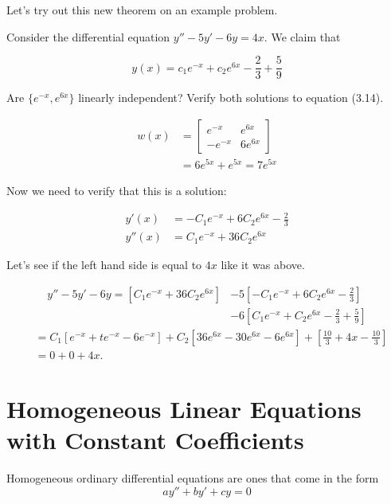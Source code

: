   Let's try out this new theorem on an example problem.

  \begin{problem}
    Consider the differential equation $y''-5y'-6y=4x$. We claim that 

    \begin{equation}
      y(x)=c_1e^{-x}+c_2e^{6x}-\frac{2}{3}+\frac{5}{9}
    \end{equation}

    Are $\{e^{-x},e^{6x}\}$ linearly independent? Verify both solutions to equation (3.14).

    \begin{align}
      w(x)&=\begin{bmatrix} e^{-x}&e^{6x}\\-e^{-x}&6e^{6x} \end{bmatrix} \\
          &=6e^{5x}+e^{5x}=7e^{5x}
    \end{align}

    Now we need to verify that this is a solution:

    \begin{align}
      y'(x)&=-C_1e^{-x}+6C_2e^{6x}-\frac{2}{3}\\
      y''(x)&=C_1e^{-x}+36C_2e^{6x}
    \end{align}

     Let's see if the left hand side is equal to $4x$ like it was above.

     \begin{align*}
       y''-5y'-6y=\left[C_1e^{-x}+36C_2e^{6x}\right]&-5\left[-C_1e^{-x}+6C_2e^{6x}-\frac{2}{3}\right]\\
                                                    &-6\left[C_1e^{-x}+C_2e^{6x}-\frac{2}{3}+\frac{5}{9}\right]
     \end{align*}
     \begin{align*}
       &=C_1[e^{-x}+te^{-x}-6e^{-x}]+C_2[36e^{6x}-30e^{6x}-6e^{6x}]+\left[\frac{10}{3}+4x-\frac{10}{3}\right]\\
       &=0+0+4x
     .\end{align*}

  \end{problem}

\section{Homogeneous Linear Equations with Constant Coefficients}

  Homogeneous ordinary differential equations are ones that come in the form 
  \begin{equation}
    ay''+by'+cy=0
  \end{equation}

